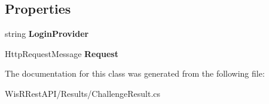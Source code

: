 \subsection*{Properties}
\begin{DoxyCompactItemize}
\item 
\hypertarget{class_wis_r_rest_a_p_i_1_1_results_1_1_challenge_result_a2c8066a4bbde60939745c30b6f0efbfd}{}string {\bfseries Login\+Provider}\label{class_wis_r_rest_a_p_i_1_1_results_1_1_challenge_result_a2c8066a4bbde60939745c30b6f0efbfd}

\item 
\hypertarget{class_wis_r_rest_a_p_i_1_1_results_1_1_challenge_result_a9a55efc2ddd388614c7ed5c93c33a51d}{}Http\+Request\+Message {\bfseries Request}\label{class_wis_r_rest_a_p_i_1_1_results_1_1_challenge_result_a9a55efc2ddd388614c7ed5c93c33a51d}

\end{DoxyCompactItemize}


The documentation for this class was generated from the following file\+:\begin{DoxyCompactItemize}
\item 
Wis\+R\+Rest\+A\+P\+I/\+Results/Challenge\+Result.\+cs\end{DoxyCompactItemize}
